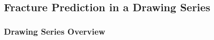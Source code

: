 \documentclass[sn-mathphys,Numbered]{sn-jnl}%
\begin{document}
%		
%		



\subsection{Fracture Prediction in a Drawing Series}



\subsubsection{Drawing Series Overview}

\end{document}
